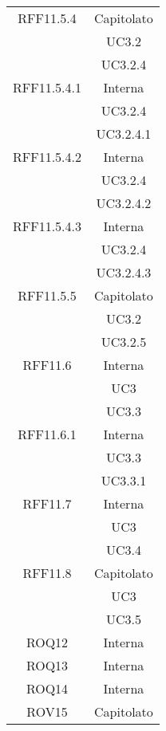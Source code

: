 \begin{longtable}{|c|c|}
\midrule
RFF11.5.4
& Capitolato\\
& UC3.2\\
& UC3.2.4\\

\midrule
RFF11.5.4.1
& Interna\\
& UC3.2.4\\
& UC3.2.4.1\\

\midrule
RFF11.5.4.2
& Interna\\
& UC3.2.4\\
& UC3.2.4.2\\

\midrule
RFF11.5.4.3
& Interna\\
& UC3.2.4\\
& UC3.2.4.3\\

\midrule
RFF11.5.5
& Capitolato\\
& UC3.2\\
& UC3.2.5\\

\midrule
RFF11.6
& Interna\\
& UC3\\
& UC3.3\\

\midrule
RFF11.6.1
& Interna\\
& UC3.3\\
& UC3.3.1\\

\midrule
RFF11.7
& Interna\\
& UC3\\
& UC3.4\\

\midrule
RFF11.8
& Capitolato\\
& UC3\\
& UC3.5\\



\midrule
ROQ12
& Interna\\

\midrule
ROQ13
& Interna\\

\midrule
ROQ14
& Interna\\



\midrule
ROV15
& Capitolato\\


\end{longtable}
